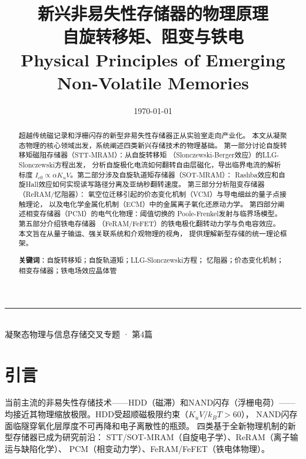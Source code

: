 \documentclass[11pt,a4paper,twoside]{article}
\theoremstyle{definition}\newtheorem{definition}{定义}[section]
\theoremstyle{plain}\newtheorem{theorem}{定理}[section]
\theoremstyle{remark}\newtheorem{remark}{注解}[section]
\begin{document}
\title{{\Huge\bfseries 新兴非易失性存储器的物理原理}\\[8pt]
       {\Large 自旋转移矩、阻变与铁电}\\[12pt]
       {\normalsize Physical Principles of Emerging Non-Volatile Memories}}
\author{}\date{\today}
\maketitle

\begin{center}\rule{0.8\textwidth}{0.5pt}\\[8pt]
{\small 凝聚态物理与信息存储交叉专题 · 第4篇}\\[4pt]
\end{center}

\begin{abstract}
\noindent
超越传统磁记录和浮栅闪存的新型非易失性存储器正从实验室走向产业化。
本文从凝聚态物理的核心领域出发，系统阐述四类新兴存储技术的物理基础。
第一部分讨论自旋转移矩磁阻存储器（STT-MRAM）：从自旋转移矩
（Slonczewski-Berger效应）的LLG-Slonczewski方程出发，
分析自旋极化电流如何翻转自由层磁化，导出临界电流的解析标度
$I_{c0} \propto \alpha K_u V$。第二部分涉及自旋轨道矩存储器（SOT-MRAM）：
Rashba效应和自旋Hall效应如何实现读写路径分离及亚纳秒翻转速度。
第三部分分析阻变存储器（ReRAM/忆阻器）：
氧空位迁移引起的价态变化机制（VCM）与导电细丝的量子点接触理论，
以及电化学金属化机制（ECM）中的金属离子氧化还原动力学。
第四部分阐述相变存储器（PCM）的电气化物理：阈值切换的
Poole-Frenkel发射与临界场模型。第五部分介绍铁电存储器
（FeRAM/FeFET）的铁电极化翻转动力学与负电容效应。
本文旨在从量子输运、强关联系统和介观物理的视角，
提供理解新型存储的统一理论框架。

\medskip
\noindent\textbf{关键词}：自旋转移矩；自旋轨道矩；LLG-Slonczewski方程；
忆阻器；价态变化机制；相变存储器；铁电场效应晶体管
\end{abstract}

\tableofcontents\newpage

\section{引言}

当前主流的非易失性存储技术——HDD（磁滞）和NAND闪存（浮栅电荷）——
均接近其物理缩放极限。HDD受超顺磁极限约束（$K_u V / k_B T > 60$），
NAND闪存面临隧穿氧化层厚度不可再降和电子离散性的瓶颈。
四类基于全新物理机制的新型存储器已成为研究前沿：
STT/SOT-MRAM（自旋电子学）、ReRAM（离子输运与缺陷化学）、
PCM（相变动力学）、FeRAM/FeFET（铁电体物理）。
\end{document}
